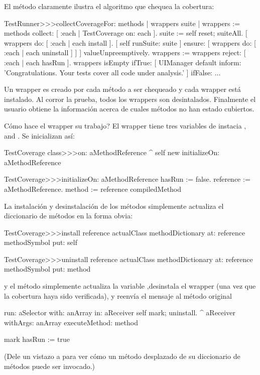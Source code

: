 \documentclass[a4paper,10pt,twoside]{book}
\begin{document}
El m\'etodo  claramente ilustra el algoritmo que chequea la cobertura:
\begin{code}{}
TestRunner>>>collectCoverageFor: methods
        | wrappers suite |
        wrappers := methods collect: [ :each | TestCoverage on: each ].
        suite := self
                reset;
                suiteAll.
        [ wrappers do: [ :each | each install ].
          [ self runSuite: suite ] ensure: [ wrappers do: [ :each | each uninstall ] ] ] valueUnpreemptively.
        wrappers := wrappers reject: [ :each | each hasRun ].
        wrappers isEmpty
                ifTrue:
                        [ UIManager default inform: 'Congratulations. Your tests cover all code under analysis.' ]
                ifFalse: ...
\end{code}
Un wrapper es creado por cada m\'etodo a ser chequeado y cada wrapper está instalado. Al corror la prueba, todos los wrappers son desintalados. Finalmente el usuario obtiene la informaci\'on acerca de cuales m\'etodos no han estado cubiertos.

C\'omo hace el wrapper su trabajo? El wrapper  tiene tres variables de instacia ,  and .
Se inicializan as\'i:
\begin{code}{}
TestCoverage class>>>on: aMethodReference
        ^ self new initializeOn: aMethodReference

TestCoverage>>>initializeOn: aMethodReference
        hasRun := false.
        reference := aMethodReference.
        method := reference compiledMethod
\end{code}

La instalaci\'on y desinstalaci\'on de los m\'etodos simplemente actualiza el diccionario de m\'etodos en la forma obvia:
\begin{code}{}
TestCoverage>>>install
        reference actualClass methodDictionary
                at: reference methodSymbol
                put: self

TestCoverage>>>uninstall
        reference actualClass methodDictionary
                at: reference methodSymbol
                put: method
\end{code}
\noindent
y el m\'etodo  simplemente actualiza la variable  ,desinstala el wrapper (una vez que la cobertura haya sido verificada), y reenv\'ia el mensaje al m\'etodo original
\begin{code}{}
run: aSelector with: anArray in: aReceiver
        self mark; uninstall.
        ^ aReceiver withArgs: anArray executeMethod: method

mark
        hasRun := true
\end{code}
(Dele un vistazo a  para ver c\'omo  un m\'etodo desplazado de su diccionario de m\'etodos puede ser invocado.)
\end{document}
